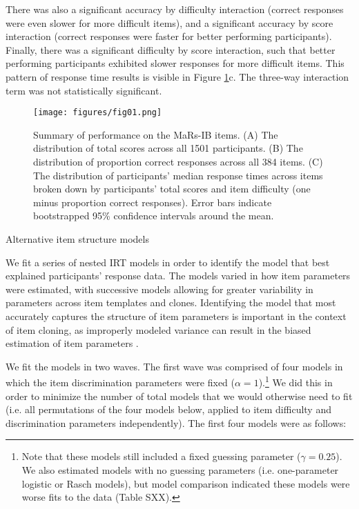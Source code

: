 \documentclass[a4paper,man,natbib]{apa6}
\makeatletter
\renewcommand{\subsubsection}{\@startsection{subsubsection}{3}
  {\z@}%
  {\b@level@two@skip}{\e@level@two@skip}%
  {\normalfont\normalsize\bfseries}}
\makeatother
\begin{document}
There was also a significant accuracy by difficulty interaction (correct responses were even slower for more difficult items), and a significant accuracy by score interaction (correct responses were faster for better performing participants). Finally, there was a significant difficulty by score interaction, such that better performing participants exhibited slower responses for more difficult items. This pattern of response time results is visible in Figure \ref{fig:fig01}c. The three-way interaction term was not statistically significant. 

\begin{figure}
\centering
\texttt{[image: figures/fig01.png]}
\caption{\label{fig:fig01}Summary of performance on the MaRs-IB items. (A) The distribution of total scores across all 1501 participants. (B) The distribution of proportion correct responses across all 384 items. (C) The distribution of participants' median response times across items broken down by participants' total scores and item difficulty (one minus proportion correct responses). Error bars indicate bootstrapped 95\% confidence intervals around the mean.}
\end{figure}
 
\subsubsection{Alternative item structure models}

We fit a series of nested IRT models in order to identify the model that best explained participants' response data. The models varied in how item parameters were estimated, with successive models allowing for greater variability in parameters across item templates and clones. Identifying the model that most accurately captures the structure of item parameters is important in the context of item cloning, as improperly modeled variance can result in the biased estimation of item parameters \citep{lathrop2017item}. 

We fit the models in two waves. The first wave was comprised of four models in which the item discrimination parameters were fixed ($\alpha = 1$).\footnote{Note that these models still included a fixed guessing parameter ($\gamma = 0.25$). We also estimated models with no guessing parameters (i.e. one-parameter logistic or Rasch models), but model comparison indicated these models were worse fits to the data (Table SXX).} We did this in order to minimize the number of total models that we would otherwise need to fit (i.e. all permutations of the four models below, applied to item difficulty and discrimination parameters independently). The first four models were as follows:
\end{document}
